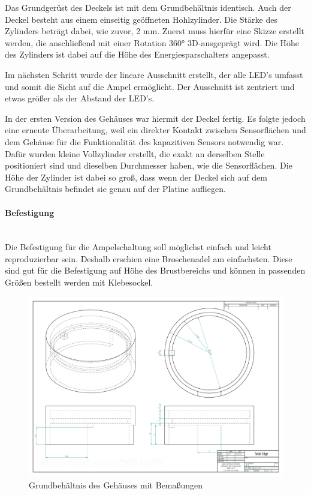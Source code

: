 \documentclass[a4paper,
DIV=13,
12pt,
BCOR=10mm,
department=FakEI,
parskip=half,
automark,
]{article}
\begin{document}
Das Grundgerüst des Deckels ist mit dem Grundbehältnis identisch. Auch der Deckel besteht aus einem einseitig geöffneten Hohlzylinder. Die Stärke des Zylinders beträgt dabei, wie zuvor, 2 mm. Zuerst muss hierfür eine Skizze erstellt werden, die anschließend mit einer Rotation 360° 3D-ausgeprägt wird. Die Höhe des Zylinders ist dabei auf die Höhe des Energiesparschalters angepasst. 

Im nächsten Schritt wurde der lineare Ausschnitt erstellt, der alle LED's umfasst und somit die Sicht auf die Ampel ermöglicht. Der Ausschnitt ist zentriert und etwas größer als der Abstand der LED's. 

In der ersten Version des Gehäuses war hiermit der Deckel fertig. Es folgte jedoch eine erneute Überarbeitung, weil ein direkter Kontakt zwischen Sensorflächen und dem Gehäuse für die Funktionalität des kapazitiven Sensors notwendig war. Dafür wurden kleine Vollzylinder erstellt, die exakt an derselben Stelle positioniert sind und dieselben Durchmesser haben, wie die Sensorflächen. Die Höhe der Zylinder ist dabei so groß, dass wenn der Deckel sich auf dem Grundbehältnis befindet sie genau auf der Platine aufliegen.  

\paragraph{Befestigung} $~$ \\

Die Befestigung für die Ampelschaltung soll möglichst einfach und leicht reproduzierbar sein. Deshalb erschien eine Broschenadel am einfachsten. Diese sind gut für die Befestigung auf Höhe des Brustbereichs und können in passenden Größen bestellt werden mit Klebesockel. 


\begin{figure}[!hbpt]
 \begin{center} \includegraphics[width=1.4\textwidth,angle=-90]{gehauuse_4.pdf}
 \caption{Grundbehältnis des Gehäuses mit Bemaßungen}
 \label{fig:Grundbe}
  \end{center}
\end{figure}
\end{document}
